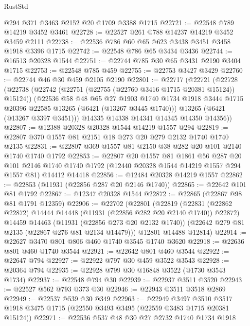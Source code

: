 \begin{lexlean}{RustStd}
\begin{coremodule}
    @294
    @371
    @3463
    @2152
    @20
    @1709
    @3388
    @1715
@22721 := @22548 @789 @14219 @3452 @3461
@22728 := @22527 @261 @788 @14237 @14219 @3452 @3459 @2111
@22738 := @22536 @786 @60 @65 @623 @3438 @3451 @3458 @1918 @3396 @1715
@22742 := @22548 @786 @65 @3434 @3436
@22744 := @16513 @20328 @1544
@22751 := @22744 @785 @30 @65 @3431 @2190 @3404 @1715
@22753 := @22548 @785 @459
@22755 := @22753 @3427 @3429
@22760 := @22744 @46 @30 @459 @2105 @2190
@22801 := @22717
    (@22721
      (@22728
        (@22738
          (@22742 (@22751 (@22755 (@22760 @3416 @1715 @20381 @15124)) @15124))
          (@22536
            @58
            @48
            @65
            @27
            @1903
            @1740
            @1734
            @1918
            @3444
            @1715
            @20396
            @22585
            @13265
            (@6421 (@13267 @3445 @1740)))
          @13265
          (@6421 (@13267 @3397 @3451)))
        @14335
        @14338
        @14341
        @14345
        @14350
        @14356))
@22807 := @12388 @20328 @20328 @1544 @14219 @1557 @294
@22819 := @22807 @370 @1557 @81 @2151 @18 @273 @20 @279 @2132 @1740 @1740 @2135
@22831 := @22807 @369 @1557 @81 @2150 @38 @282 @20 @101 @2140 @1740 @1740 @1792
@22853 := @22807
    @20
    @1557
    @81
    @1861
    @56
    @287
    @20
    @101
    @2146
    @1740
    @1740
    @1792
    (@12440 @20328 @1544 @14219 @1557 @294 @1557 @81)
    @14412
    @14418
@22856 := @12484 @20328 @14219 @1557
@22862 := @22853 (@11931 (@22856 @287 @20 @2146 @1740))
@22865 := @22642 @101 @81 @1792
@22867 := @12347 @20328 @1544
@22872 := @22865 (@22867 @98 @81 @1791 @12359)
@22906 := @22702
    (@22801
      (@22819
        (@22831 (@22862 @22872) @14444 @14448 (@11931 (@22856 @282 @20 @2140 @1740)) @22872)
        @14459
        @14463
        (@11931 (@22856 @273 @20 @2132 @1740))
        (@22642 @279 @81 @2135 (@22867 @276 @81 @2134 @14479)))
      @12801
      @14488
      @12814)
@22914 := @22627 @3470 @801 @806 @460 @1740 @3545 @1740 @3620
@22918 := @22636 @801 @460 @1740 @3544
@22921 := @22642 @801 @460 @3544
@22922 := @22647 @794
@22927 := @22922 @797 @30 @459 @3522 @3543
@22928 := @20364 @794
@22935 := @22928 @799 @30 @16848 @3522 (@1730 @3543 @1734)
@22937 := @22548 @794 @30
@22939 := @22937 @3511 @3520
@22943 := @22527 @562 @793 @373 @30
@22946 := @22943 @3511 @3518 @2869
@22949 := @22537 @539 @30 @349
@22963 := @22949
    @3497
    @3510
    @3517
    @1918
    @3475
    @1715
    (@22550 @3493 @3495 (@22559 @3483 @1715 @20381 @15124))
@22971 := @22536 @537 @48 @30 @27 @2732 @1740 @1734 @1918

\end{coremodule}
\end{lexlean}
